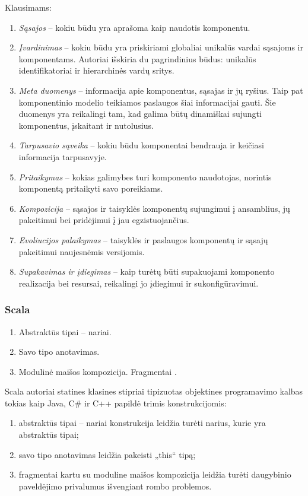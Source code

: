 \begin{frame}
\begin{handout}
    Klausimams:
    \begin{enumerate}
      \item \emph{Sąsajos} – kokiu būdu yra aprašoma kaip naudotis
        komponentu.
      \item \emph{Įvardinimas} – kokiu būdu yra priskiriami globaliai
        unikalūs vardai sąsajoms ir komponentams. Autoriai išskiria
        du pagrindinius būdus: unikalūs identifikatoriai ir
        hierarchinės vardų sritys.
      \item \emph{Meta duomenys} – informacija apie komponentus, sąsajas
        ir jų ryšius. Taip pat komponentinio modelio teikiamos paslaugos
        šiai informacijai gauti. Šie duomenys yra reikalingi tam, kad
        galima būtų dinamiškai sujungti komponentus, įskaitant ir
        nutolusius.
      \item \emph{Tarpusavio sąveika} – kokiu būdu komponentai bendrauja
        ir keičiasi informacija tarpusavyje.
      \item \emph{Pritaikymas} – kokias galimybes turi komponento
        naudotojas, norintis komponentą pritaikyti savo poreikiams.
      \item \emph{Kompozicija} – sąsajos ir taisyklės komponentų
        sujungimui į ansamblius, jų pakeitimui bei pridėjimui į jau
        egzistuojančius.
      \item \emph{Evoliucijos palaikymas} – taisyklės ir paslaugos
        komponentų ir sąsajų pakeitimui naujesnėmis versijomis.
      \item \emph{Supakavimas ir įdiegimas} – kaip turėtų būti supakuojami
        komponento realizacija bei resursai, reikalingi jo įdiegimui
        ir sukonfigūravimui.
    \end{enumerate}
  \end{handout}
\end{frame}

\begin{frame}
  \frametitle{Scala}
  \begin{enumerate}
    \item Abstraktūs tipai – nariai.
    \item Savo tipo anotavimas.
    \item Modulinė maišos kompozicija. Fragmentai .
  \end{enumerate}
  \begin{handout}
    Scala autoriai statines klasines stipriai tipizuotas objektines
    programavimo kalbas tokias kaip Java, C\# ir C++ papildė trimis
    konstrukcijomis:
    \begin{enumerate}
      \item abstraktūs tipai – nariai konstrukcija leidžia turėti
        narius, kurie yra abstraktūs tipai;
      \item savo tipo anotavimas leidžia pakeisti „this“ tipą;
      \item fragmentai kartu su moduline maišos kompozicija leidžia
        turėti daugybinio paveldėjimo privalumus išvengiant
        rombo problemos.
    \end{enumerate}
  \end{handout}
\end{frame}

